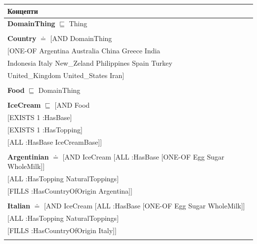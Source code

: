 \documentclass[12pt]{article}
\newcommand*{\MyIndent}{\hspace*{7em}}
\begin{document}
        \begin{tabularx}{1\textwidth}{@{}X@{}}
        \toprule
        \textbf{Концепти} \\
        \midrule
        \endhead

            \textbf{DomainThing} $\sqsubseteq$ Thing \\ \tabularnewline
        
            \textbf{Country} $\doteq$ [AND DomainThing \\
                            \MyIndent [ONE-OF Argentina Australia China Greece India \\
                                    \MyIndent Indonesia Italy New\_Zeland Philippines Spain Turkey \\
                                    \MyIndent United\_Kingdom United\_States Iran] \\
                            \tabularnewline

            \textbf{Food} $\sqsubseteq$ DomainThing \\ \tabularnewline


            
            \textbf{IceCream} $\sqsubseteq$ [AND Food \\
                                      \MyIndent [EXISTS 1 :HasBase] \\
                                      \MyIndent [EXISTS 1 :HasTopping] \\
                                      \MyIndent [ALL :HasBase IceCreamBase]] \\
                                      \tabularnewline
           
            \textbf{Argentinian} $\doteq$ [AND IceCream [ALL :HasBase [ONE-OF Egg Sugar WholeMilk]] \\
                                              \MyIndent [ALL :HasTopping NaturalToppings] \\
                                              \MyIndent [FILLS :HasCountryOfOrigin Argentina]] \\
                                              \tabularnewline
           
            \textbf{Italian} $\doteq$ [AND IceCream [ALL :HasBase [ONE-OF Egg Sugar WholeMilk]] \\
                                          \MyIndent [ALL :HasTopping NaturalToppings] \\
                                          \MyIndent [FILLS :HasCountryOfOrigin Italy]] \\
                                          \tabularnewline
            

\end{tabularx}
\end{document}
